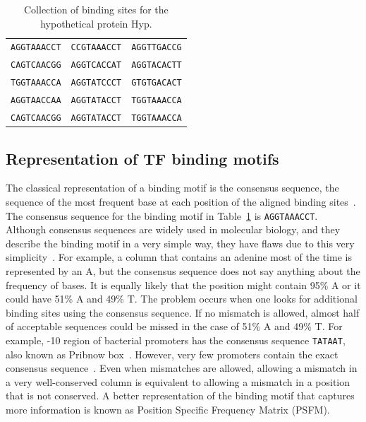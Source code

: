 \begin{table}[h]
  \centering
  \caption{Collection of binding sites for the hypothetical protein Hyp.}
  \label{tab:lexa-motif}
  \begin{tabular}{c c c}
\texttt{AGGTAAACCT} & \texttt{CCGTAAACCT} & \texttt{AGGTTGACCG}\\
\texttt{CAGTCAACGG} & \texttt{AGGTCACCAT} & \texttt{AGGTACACTT}\\
\texttt{TGGTAAACCA} & \texttt{AGGTATCCCT} & \texttt{GTGTGACACT}\\
\texttt{AGGTAACCAA} & \texttt{AGGTATACCT} & \texttt{TGGTAAACCA}\\
\texttt{CAGTCAACGG} & \texttt{AGGTATACCT} & \texttt{TGGTAAACCA}
   \end{tabular}
\end{table}


\subsection{Representation of TF binding motifs}

The classical representation of a binding motif is the consensus sequence, the
sequence of the most frequent base at each position of the aligned binding
sites~\citep{pierce2012genetics}. The consensus sequence for the binding motif
in Table~\ref{tab:lexa-motif} is \texttt{AGGTAAACCT}. Although consensus
sequences are widely used in molecular biology, and they describe the binding
motif in a very simple way, they have flaws due to this very
simplicity~\citep{schneider2002consensus}. For example, a column that contains
an adenine most of the time is represented by an A, but the consensus sequence
does not say anything about the frequency of bases. It is equally likely that
the position might contain 95\% A or it could have 51\% A and 49\% T. The
problem occurs when one looks for additional binding sites using the consensus
sequence.  If no mismatch is allowed, almost half of acceptable sequences could
be missed in the case of 51\% A and 49\% T. For example, -10 region of
bacterial promoters has the consensus sequence \texttt{TATAAT}, also known as
Pribnow box~\citep{pribnow1975nucleotide}. However,  very few promoters
contain the exact consensus sequence~\citep{lisser1993compilation}. Even when
mismatches are allowed, allowing a mismatch in a very well-conserved column
is equivalent to allowing a mismatch in a position that is not
conserved. A better representation of the binding motif that captures more
information is known as Position Specific Frequency Matrix (PSFM).

